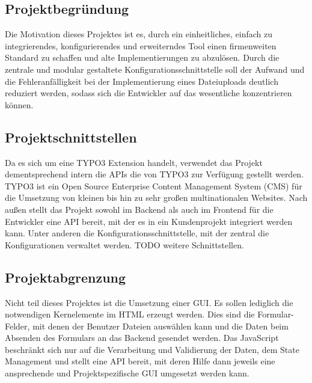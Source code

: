 \subsection{Projektbegründung} 
\label{sec:Projektbegruendung}
Die Motivation dieses Projektes ist es, durch ein einheitliches, einfach zu integrierendes, konfigurierendes und erweiterndes Tool einen firmenweiten Standard zu schaffen und alte Implementierungen zu abzulösen. Durch die zentrale und modular gestaltete Konfigurationsschnittstelle soll der Aufwand und die Fehleranfälligkeit bei der Implementierung eines Dateiuploads deutlich reduziert werden, sodass sich die Entwickler auf das wesentliche konzentrieren können.


\subsection{Projektschnittstellen} 
\label{sec:Projektschnittstellen}
Da es sich um eine TYPO3 Extension handelt, verwendet das Projekt dementsprechend intern die APIs die von TYPO3 zur Verfügung gestellt werden. TYPO3 ist ein Open Source Enterprise Content Management System (CMS) für die Umsetzung von kleinen bis hin zu sehr großen multinationalen Websites. Nach außen stellt das Projekt sowohl im Backend als auch im Frontend für die Entwickler eine API bereit, mit der es in ein Kundenprojekt integriert werden kann. Unter anderen die Konfigurationsschnittstelle, mit der zentral die Konfigurationen verwaltet werden. TODO weitere Schnittstellen.


\subsection{Projektabgrenzung} 
\label{sec:Projektabgrenzung}
Nicht teil dieses Projektes ist die Umsetzung einer GUI. Es sollen lediglich die notwendigen Kernelemente im HTML erzeugt werden. Dies sind die Formular-Felder, mit denen der Benutzer Dateien auswählen kann und die Daten beim Absenden des Formulars an das Backend gesendet werden. Das JavaScript beschränkt sich nur auf die Verarbeitung und Validierung der Daten, dem State Management und stellt eine API bereit, mit deren Hilfe dann jeweils eine ansprechende und Projektspezifische GUI umgesetzt werden kann.
